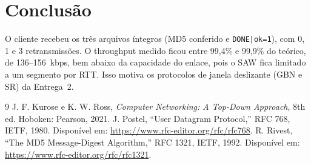 \documentclass[11pt,a4paper]{article}
\begin{document}
\section{Conclusão}

O cliente recebeu os três arquivos íntegros (MD5 conferido e \texttt{DONE|ok=1}), com 0, 1
e 3 retransmissões. O throughput medido ficou entre 99,4\% e 99,9\% do teórico, de
136--156~kbps, bem abaixo da capacidade do enlace, pois o SAW fica limitado a um segmento por RTT.
Isso motiva os protocolos de janela deslizante (GBN e SR) da Entrega~2.

\begin{thebibliography}{9}
    J. F. Kurose e K. W. Ross, \textit{Computer Networking: A Top-Down Approach},
    8th ed. Hoboken: Pearson, 2021.
    J. Postel, ``User Datagram Protocol,'' RFC 768, IETF, 1980.
    Disponível em: \url{https://www.rfc-editor.org/rfc/rfc768}.
    R. Rivest, ``The MD5 Message-Digest Algorithm,'' RFC 1321, IETF, 1992.
    Disponível em: \url{https://www.rfc-editor.org/rfc/rfc1321}.
\end{thebibliography}
\end{document}
